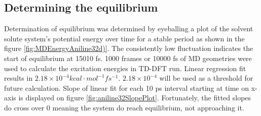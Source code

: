 \documentclass[
journal=jpcbfk, %
manuscript=article]{achemso}
\begin{document}
\subsection{Determining the equilibrium}
Determination of equilibrium was determined by eyeballing a plot of the solvent solute system's potential energy over time for a stable period as shown in the figure \ref{fig:MDEnergyAniline32d)}. The consistently low fluctuation indicates the start of equilibrium at 15010 fs. 1000 frames or 10000 fs of MD geometries were used to calculate the excitation energies in TD-DFT run. Linear regression fit results in \(2.18\times 10^{-4} kcal\cdot mol^{-1}fs^{-1} \). \(2.18\times 10^{-4}\) will be used as a threshold for future calculation. Slope of linear fit for each 10 ps interval starting at time on x-axis is displayed on figure \ref{fig:aniline32SlopePlot}. Fortunately, the fitted slopes do cross over 0 meaning the system do reach equilibrium, not approaching it.
\end{document}
